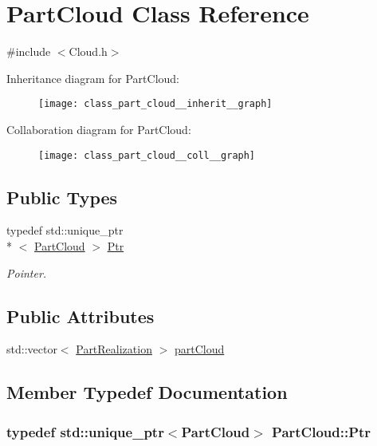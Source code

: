 \hypertarget{class_part_cloud}{\section{Part\-Cloud Class Reference}
\label{class_part_cloud}
}


{\ttfamily \#include $<$Cloud.\-h$>$}



Inheritance diagram for Part\-Cloud\-:\nopagebreak
\begin{figure}[H]
\begin{center}
\leavevmode
\texttt{[image: class\_part\_cloud\_\_inherit\_\_graph]}
\end{center}
\end{figure}


Collaboration diagram for Part\-Cloud\-:\nopagebreak
\begin{figure}[H]
\begin{center}
\leavevmode
\texttt{[image: class\_part\_cloud\_\_coll\_\_graph]}
\end{center}
\end{figure}
\subsection*{Public Types}
\begin{DoxyCompactItemize}
\item 
typedef std\-::unique\-\_\-ptr\\*
$<$ \hyperlink{class_part_cloud}{Part\-Cloud} $>$ \hyperlink{class_part_cloud_aec4e083f6d74ba725a554de89e56b170}{Ptr}
\begin{DoxyCompactList}\small\item\em Pointer. \end{DoxyCompactList}\end{DoxyCompactItemize}
\subsection*{Public Attributes}
\begin{DoxyCompactItemize}
\item 
std\-::vector$<$ \hyperlink{class_part_realization}{Part\-Realization} $>$ \hyperlink{class_part_cloud_a22d75c4d769cbf7223c429809de20641}{part\-Cloud}
\end{DoxyCompactItemize}


\subsection{Member Typedef Documentation}
\hypertarget{class_part_cloud_aec4e083f6d74ba725a554de89e56b170}{
\subsubsection[{Ptr}]{\setlength{\rightskip}{0pt plus 5cm}typedef std\-::unique\-\_\-ptr$<${\bf Part\-Cloud}$>$ {\bf Part\-Cloud\-::\-Ptr}}}\label{class_part_cloud_aec4e083f6d74ba725a554de89e56b170}


